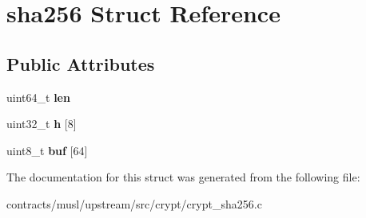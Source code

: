 \hypertarget{structsha256}{}\section{sha256 Struct Reference}
\label{structsha256}
\subsection*{Public Attributes}
\begin{DoxyCompactItemize}
\item 
\mbox{\label{structsha256_a41849b8a27e385d7c4525ceb96cf308e}} 
uint64\+\_\+t {\bfseries len}
\item 
\mbox{\label{structsha256_ac800ded849114b27122d65693f893039}} 
uint32\+\_\+t {\bfseries h} \mbox{[}8\mbox{]}
\item 
\mbox{\label{structsha256_ad97dc2b0a0833fd60aa8b87a5c1ea16e}} 
uint8\+\_\+t {\bfseries buf} \mbox{[}64\mbox{]}
\end{DoxyCompactItemize}


The documentation for this struct was generated from the following file\+:\begin{DoxyCompactItemize}
\item 
contracts/musl/upstream/src/crypt/crypt\+\_\+sha256.\+c\end{DoxyCompactItemize}
